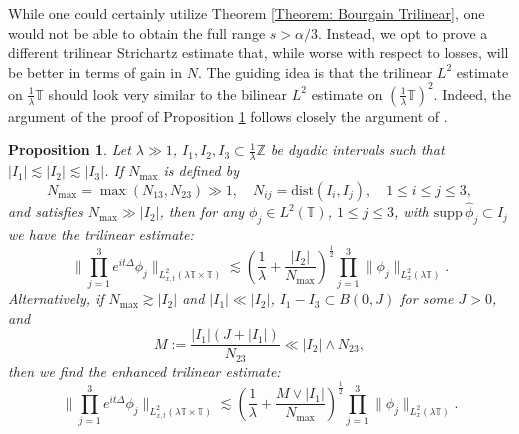\documentclass[12pt, letterpaper]{amsart}
\newtheorem{proposition}{Proposition}
\begin{document}
While one could certainly utilize Theorem \ref{Theorem: Bourgain Trilinear}, one would not be able to obtain the full range $s > \alpha/3$. Instead, we opt to prove a different trilinear Strichartz estimate that, while worse with respect to losses, will be better in terms of gain in $N$. The guiding idea is that the trilinear $L^2$ estimate on $\tfrac{1}{\lambda}\mathbb{T}$ should look very similar to the bilinear $L^2$ estimate on $(\tfrac{1}{\lambda}\mathbb{T})^2$. Indeed, the argument of the proof of Proposition  
\ref{Proposition: Trilinear Free Estimate} follows closely the argument of \cite[Proposition 4.6]{de2007global}.

\begin{proposition}\label{Proposition: Trilinear Free Estimate}
    Let $\lambda\gg 1$, $I_1, I_2, I_3\subset \frac{1}{\lambda}\mathbb{Z}$ be dyadic intervals such that $|I_1|\lesssim |I_2|\lesssim |I_3|$. If $N_{\max}$ is defined by
    \[
    N_{\max} = \max(N_{13}, N_{23})\gg 1, \quad N_{ij} = \mathrm{dist}(I_i,I_j),\quad 1\leq i\leq  j\leq 3,
    \]
    and satisfies $N_{\max}\gg |I_2|$, then for any $\phi_j\in L^2(\mathbb{T})$, $1\leq j\leq 3$, with $\mathrm{supp}\,\widehat{\phi}_j\subset I_j$ we have the trilinear estimate:
    \begin{equation*}\label{Equation: Trilinear base}
\|\prod_{j=1}^3e^{it\Delta}\phi_j\|_{L^2_{x,t}(\lambda\mathbb{T}\times\mathbb{T})}\lesssim \left(\frac{1}{\lambda} + \frac{|I_2|}{N_{\max}}\right)^\frac{1}{2}\prod_{j=1}^3\|\phi_j\|_{L^2_x(\lambda\mathbb{T})}.
    \end{equation*}
    Alternatively, if $N_{\max}\gtrsim |I_2|$ and $|I_1|\ll|I_2|$, $I_1-I_3\subset B(0, J)$ for some $J > 0$, and
 \begin{equation}\label{Condition: M condition}
M := \frac{|I_1|(J+|I_1|)}{N_{23}}\ll |I_2|\wedge N_{23},
 \end{equation}
    then we find the enhanced trilinear estimate:
    \begin{equation*}\label{Equation: Trilinear HHL}
\|\prod_{j=1}^3e^{it\Delta}\phi_j\|_{L^2_{x,t}(\lambda\mathbb{T}\times\mathbb{T})}\lesssim \left(\frac{1}{\lambda} + \frac{M\vee |I_1|}{N_{\max}}\right)^\frac{1}{2}\prod_{j=1}^3\|\phi_j\|_{L^2_x(\lambda\mathbb{T})}.
    \end{equation*}
\end{proposition}
\end{document}
